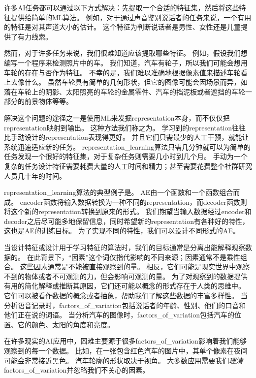 许多\gls{AI}任务都可以通过以下方式解决：先提取一个合适的特征集，然后将这些特征提供给简单的\gls{ML}算法。
例如，对于通过声音鉴别说话者的任务来说，一个有用的特征是对其声道大小的估计。
这个特征为判断说话者是男性、女性还是儿童提供了有力线索。

然而，对于许多任务来说，我们很难知道应该提取哪些特征。
例如，假设我们想编写一个程序来检测照片中的车。
我们知道，汽车有轮子，所以我们可能会想用车轮的存在与否作为特征。
不幸的是，我们难以准确地根据像素值来描述车轮看上去像什么。
虽然车轮具有简单的几何形状，但它的图像可能会因场景而异，如落在车轮上的阴影、太阳照亮的车轮的金属零件、汽车的挡泥板或者遮挡的车轮一部分的前景物体等等。


解决这个问题的途径之一是使用\gls{ML}来发掘\gls{representation}本身，而不仅仅把\gls{representation}映射到输出。
这种方法我们称之为。
学习到的\gls{representation}往往比手动设计的\gls{representation}表现得更好。
并且它们只需最少的人工干预，就能让系统迅速适应新的任务。
\gls{representation_learning}算法只需几分钟就可以为简单的任务发现一个很好的特征集，对于复杂任务则需要几小时到几个月。
手动为一个复杂的任务设计特征需要耗费大量的人工时间和精力；甚至需要花费整个社群研究人员几十年的时间。

\gls{representation_learning}算法的典型例子是。
\gls{AE}由一个函数和一个函数组合而成。
\gls{encoder}函数将输入数据转换为一种不同的\gls{representation}，而\gls{decoder}函数则将这个新的\gls{representation}转换到原来的形式。
我们期望当输入数据经过\gls{encoder}和\gls{decoder}之后尽可能多地保留信息，同时希望新的\gls{representation}有各种好的特性，
这也是\gls{AE}的训练目标。
为了实现不同的特性，我们可以设计不同形式的\gls{AE}。

当设计特征或设计用于学习特征的算法时，我们的目标通常是分离出能解释观察数据的。
在此背景下，``因素''这个词仅指代影响的不同来源；因素通常不是乘性组合。
这些因素通常是不能被直接观察到的量。
相反，它们可能是现实世界中观察不到的物体或者不可观测的力，但会影响可观测的量。
为了对观察到的数据提供有用的简化解释或推断其原因，它们还可能以概念的形式存在于人类的思维中。
它们可以被看作数据的概念或者抽象，帮助我们了解这些数据的丰富多样性。
当分析语音记录时，\gls{factors_of_variation}包括说话者的年龄、性别、他们的口音和他们正在说的词语。
当分析汽车的图像时，\gls{factors_of_variation}包括汽车的位置、它的颜色、太阳的角度和亮度。


在许多现实的\gls{AI}应用中，困难主要源于很多\gls{factors_of_variation}影响着我们能够观察到的每一个数据。
比如，在一张包含红色汽车的图片中，其单个像素在夜间可能会非常接近黑色。
汽车轮廓的形状取决于视角。
大多数应用需要我们\emph{理清}\gls{factors_of_variation}并忽略我们不关心的因素。

